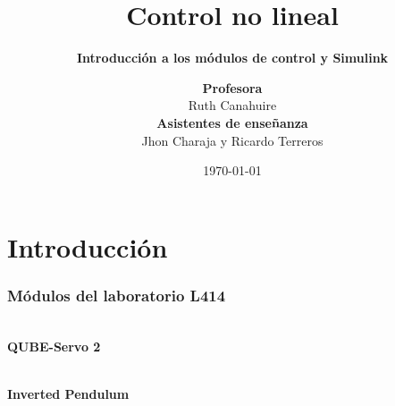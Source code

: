 

\title[Laboratorio 0]{Control no lineal}
\subtitle{\textbf{Introducción a los módulos de control y Simulink}}

\author[J. Charaja and R. Terreros (UTEC)]{\textbf {Profesora} \\ Ruth Canahuire \\ \vspace{1em} \textbf{Asistentes de enseñanza} \\ Jhon Charaja y Ricardo Terreros}


\date{\today}



	\frame{\titlepage}
	\section{Introducción}
	\begin{frame}
		\frametitle{Módulos del laboratorio L414}
		
		\begin{minipage}[t]{0.47\textwidth}
			\graphicspath{{imgs/qube/}}
			\centering
			 \\
			\vspace{1em}
			{\large \textbf{QUBE-Servo 2\footnotemark[1]}}
		\end{minipage}
		\begin{minipage}[t]{0.47\textwidth}
			\graphicspath{{imgs/inverted_pendulum/}}
			\centering
			 \\
			\vspace{1em}
			{\large \textbf{Inverted Pendulum\footnotemark[2]}}
		\end{minipage}
				
	\end{frame}
